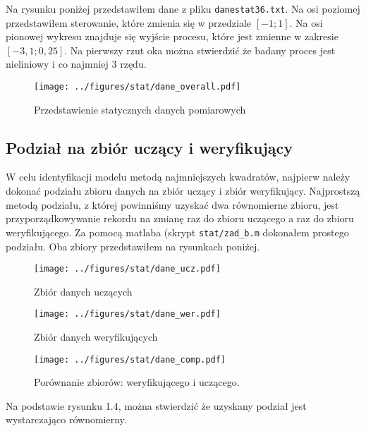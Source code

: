 \documentclass[a4paper,titlepage,11pt,floatssmall]{mwrep}
\begin{document}
\indent Na rysunku poniżej przedstawiłem dane z pliku \texttt{danestat36.txt}. Na osi poziomej przedstawiłem sterowanie, które zmienia się w przedziale $[-1; 1]$. Na osi pionowej wykresu znajduje się wyjście procesu, które jest zmienne w zakresie $[-3,1; 0,25]$. Na pierwszy rzut oka można stwierdzić że badany proces jest nieliniowy i co najmniej 3 rzędu.
\bigskip
\begin{figure}[H]
\centering
\texttt{[image: ../figures/stat/dane\_overall.pdf]}
\caption{Przedstawienie statycznych danych pomiarowych}
\end{figure}


\newpage
\subsection{Podział na zbiór uczący i weryfikujący}
\indent W celu identyfikacji modelu metodą najmniejszych kwadratów, najpierw należy dokonać podziału zbioru danych na zbiór uczący i zbiór weryfikujący. Najprostszą metodą podziału, z której powinniśmy uzyskać dwa równomierne zbioru, jest przyporządkowywanie rekordu na zmianę raz do zbioru uczącego a raz do zbioru weryfikującego. Za pomocą matlaba (skrypt \texttt{stat/zad\_{}b.m} dokonałem prostego podziału. Oba zbiory przedstawiłem na rysunkach poniżej.

\begin{figure}[H]
\centering
\texttt{[image: ../figures/stat/dane\_ucz.pdf]}
\caption{Zbiór danych uczących}
\end{figure}

\begin{figure}[H]
\centering
\texttt{[image: ../figures/stat/dane\_wer.pdf]}
\caption{Zbiór danych weryfikujących}
\end{figure}

\begin{figure}[H]
\centering
\texttt{[image: ../figures/stat/dane\_comp.pdf]}
\caption{Porównanie zbiorów: weryfikującego i uczącego.}
\end{figure}

\indent Na podstawie rysunku 1.4, można stwierdzić że uzyskany podział jest wystarczająco równomierny. 
\end{document}
